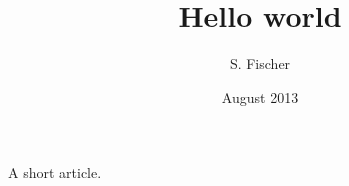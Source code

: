 \documentclass{article}
\title{Hello world}
\author{S. Fischer}
\date{August 2013}
\begin{document}
    \maketitle
    A short article.
\end{document}
